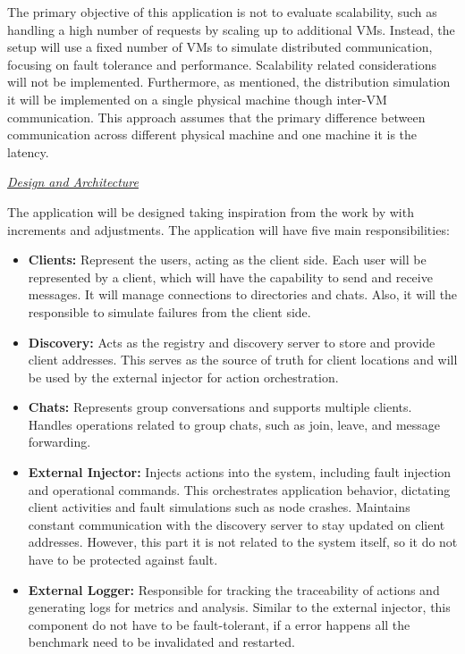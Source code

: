 The primary objective of this application is not to evaluate scalability, such as handling a high number of requests by scaling up to additional \glspl{VM}. Instead, the setup will use a fixed number of \glspl{VM} to simulate distributed communication, focusing on fault tolerance and performance. Scalability related considerations will not be implemented. Furthermore, as mentioned, the distribution simulation it will be implemented on a single physical machine though inter-VM communication. This approach assumes that the primary difference between communication across different physical machine and one machine it is the latency.

\textit{\underline{Design and Architecture}}

The application will be designed taking inspiration from the work by \textcite{Randtoul2022} with increments and adjustments. The application will have five main responsibilities:

\begin{itemize}
    \item \textbf{Clients:} Represent the users, acting as the client side. Each user will be represented by a client, which will have the capability to send and receive messages. It will manage connections to directories and chats. Also, it will the responsible to simulate failures from the client side.

    \item \textbf{Discovery:} Acts as the registry and discovery server to store and provide client addresses. This serves as the source of truth for client locations and will be used by the external injector for action orchestration.

    \item \textbf{Chats:} Represents group conversations and supports multiple clients. Handles operations related to group chats, such as join, leave, and message forwarding.

    \item \textbf{External Injector:} Injects actions into the system, including fault injection and operational commands. This orchestrates application behavior, dictating client activities and fault simulations such as node crashes. Maintains constant communication with the discovery server to stay updated on client addresses. However, this part it is not related to the system itself, so it do not have to be protected against fault.

    \item \textbf{External Logger:} Responsible for tracking the traceability of actions and generating logs for metrics and analysis. Similar to the external injector, this component do not have to be fault-tolerant, if a error happens all the benchmark need to be invalidated and restarted.
\end{itemize}

